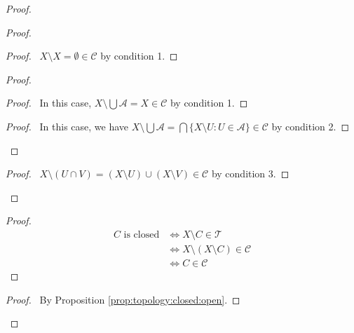 \documentclass{report}
\let\qed\relax
\theoremstyle{definition}
\begin{document}
  \begin{proof}
    \pf
    \begin{proof}
      \begin{proof}
        \pf\ $X \setminus X = \emptyset \in \mathcal{C}$ by condition 1.
      \end{proof}
      \begin{proof}
        \begin{proof}
          \pf\ In this case, $X \setminus \bigcup \mathcal{A} = X \in
          \mathcal{C}$ by condition 1.
        \end{proof}
        \begin{proof}
          \pf\ In this case, we have $X \setminus \bigcup \mathcal{A} =
          \bigcap
          \{ X \setminus U : U \in \mathcal{A} \} \in \mathcal{C}$ by
          condition
          2.
        \end{proof}
      \end{proof}
      \begin{proof}
        \pf\ $X \setminus (U \cap V) = (X \setminus U) \cup (X \setminus V)
        \in
        \mathcal{C}$ by condition 3.
      \end{proof}
    \end{proof}
    \begin{proof}
      \pf
      \begin{align*}
        C \text{ is closed} & \Leftrightarrow X \setminus C \in \mathcal{T} \\
        & \Leftrightarrow X \setminus (X \setminus C) \in \mathcal{C} \\
        & \Leftrightarrow C \in \mathcal{C}
      \end{align*}
    \end{proof}
    \begin{proof}
      \pf\ By Proposition \ref{prop:topology:closed:open}.
    \end{proof}
    \qed
  \end{proof}
\end{document}
